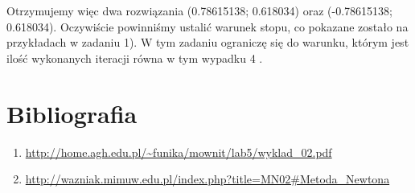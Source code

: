 \documentclass[5]{article}
\begin{document}
\vspace{4mm}


Otrzymujemy więc dwa rozwiązania (0.78615138; 0.618034) oraz (-0.78615138; 0.618034). Oczywiście powinniśmy ustalić warunek stopu, co pokazane zostało na przykładach w zadaniu 1). W tym zadaniu ograniczę się do warunku, którym jest ilość wykonanych iteracji równa w tym wypadku 4 .




\section{Bibliografia}

\begin{enumerate}
  \item \url{http://home.agh.edu.pl/~funika/mownit/lab5/wyklad_02.pdf}
  \item \url{http://wazniak.mimuw.edu.pl/index.php?title=MN02#Metoda_Newtona}
\end{enumerate}
\end{document}
